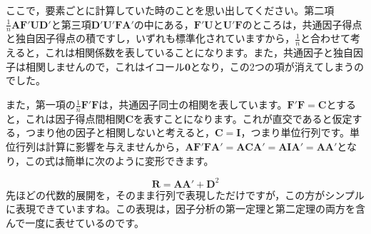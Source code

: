 \documentclass{ltjsbook}
\begin{document}
ここで，要素ごとに計算していた時のことを思い出してください。第二項$\frac{1}{n} \bm{A} \bm{F}'\bm{U} \bm{D}'$と第三項$\bm{D}' \bm{U}' \bm{F} \bm{A}'$の中にある，$\bm{F}' \bm{U}$と$\bm{U}' \bm{F}$のところは，共通因子得点と独自因子得点の積ですし，いずれも標準化されていますから，$\frac{1}{n}$と合わせて考えると，これは相関係数を表していることになります。また，共通因子と独自因子は相関しませんので，これはイコール$\bm{0}$となり，この2つの項が消えてしまうのでした。

また，第一項の$\frac{1}{n}\bm{F} ' \bm{F}$は，共通因子同士の相関を表しています。$\bm{F'F}=\bm{C}$とすると，これは因子得点間相関$\bm{C}$を表すことになります。これが直交であると仮定する，つまり他の因子と相関しないと考えると，$\bm{C} = \bm{I}$，つまり単位行列です。単位行列は計算に影響を与えませんから，$\bm{AF'FA'}=\bm{ACA'}=\bm{AIA'}=\bm{AA'}$となり，この式は簡単に次のように変形できます。

\begin{equation}
	\bm{R} = \bm{A} \bm{A} ' + \bm{D}^2
\end{equation}
先ほどの代数的展開を，そのまま行列で表現しただけですが，この方がシンプルに表現できていますね。この表現は，因子分析の第一定理と第二定理の両方を含んで一度に表せているのです。
\end{document}
